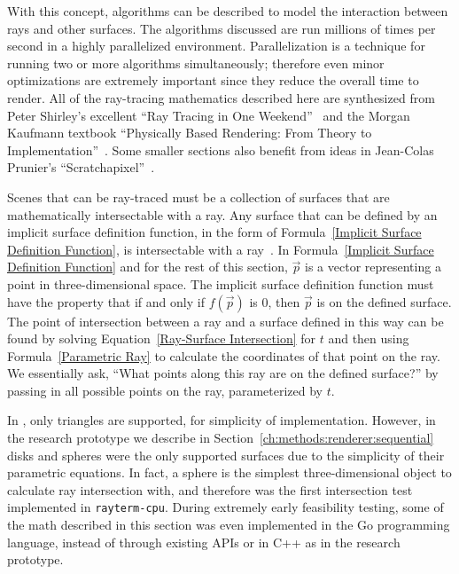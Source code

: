 
With this concept, algorithms can be described to model the interaction between rays and other surfaces.
The algorithms discussed are run millions of times per second in a highly parallelized environment.
Parallelization is a technique for running two or more algorithms simultaneously; therefore even minor optimizations are extremely important since they reduce the overall time to render.
All of the ray-tracing mathematics described here are synthesized from Peter Shirley's excellent ``Ray Tracing in One Weekend''~\cite{shirley2016ray} and the Morgan Kaufmann textbook ``Physically Based Rendering: From Theory to Implementation''~\cite{pharr2016physically}.
Some smaller sections also benefit from ideas in Jean-Colas Prunier's ``Scratchapixel''~\cite{prunier2017triangle}.

Scenes that can be ray-traced must be a collection of surfaces that are mathematically intersectable with a ray.
Any surface that can be defined by an implicit surface definition function, in the form of Formula~\ref{Implicit Surface Definition Function}, is intersectable with a ray~\cite{pharr2016physically}.
In Formula~\ref{Implicit Surface Definition Function} and for the rest of this section, $\vec{p}$ is a vector representing a point in three-dimensional space.
The implicit surface definition function must have the property that if and only if $f(\vec{p})$ is $0$, then $\vec{p}$ is on the defined surface.
The point of intersection between a ray and a surface defined in this way can be found by solving Equation~\ref{Ray-Surface Intersection} for $t$ and then using Formula~\ref{Parametric Ray} to calculate the coordinates of that point on the ray.
We essentially ask, ``What points along this ray are on the defined surface?'' by passing in all possible points on the ray, parameterized by $t$.



In \name{}, only triangles are supported, for simplicity of implementation.
However, in the research prototype we describe in Section~\ref{ch:methods:renderer:sequential} disks and spheres were the only supported surfaces due to the simplicity of their parametric equations.
In fact, a sphere is the simplest three-dimensional object to calculate ray intersection with, and therefore was the first intersection test implemented in \texttt{rayterm-cpu}.
During extremely early feasibility testing, some of the math described in this section was even implemented in the Go programming language, instead of through existing APIs or in C++ as in the research prototype.

